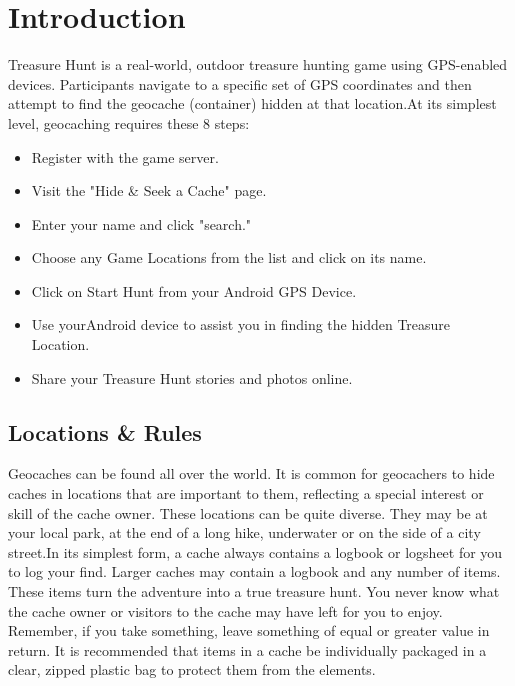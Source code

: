 



\usepackage{titlesec}
\titleformat{\chapter}[display]
{\normalfont\Large\bfseries}{\centering\chaptertitlename\ \thechapter}{12pt}{\Large}
\titlespacing*{\chapter}{0pt}{0pt}{10pt}


\chapter{ Introduction}
Treasure Hunt is a real-world, outdoor treasure hunting game using GPS-enabled devices. Participants navigate to a specific set of GPS coordinates and then attempt to find the geocache (container) hidden at that location.At its simplest level, geocaching requires these 8 steps:
\begin{itemize}



  \item Register with the game server.
  \item Visit the "Hide & Seek a Cache" page.
  \item Enter your name  and click "search."
  \item Choose any Game Locations from the list and click on its name.
  \item Click on Start Hunt from your Android  GPS Device.
  \item Use yourAndroid  device to assist you in finding the hidden Treasure Location.
   \item Share your Treasure Hunt stories and photos online.
 
\end{itemize}




\section{Locations & Rules }
Geocaches can be found all over the world. It is common for geocachers to hide caches in locations that are important to them, reflecting a special interest or skill of the cache owner. These locations can be quite diverse. They may be at your local park, at the end of a long hike, underwater or on the side of a city street.In its simplest form, a cache always contains a logbook or logsheet for you to log your find. Larger caches may contain a logbook and any number of items. These items turn the adventure into a true treasure hunt. You never know what the cache owner or visitors to the cache may have left for you to enjoy. Remember, if you take something, leave something of equal or greater value in return. It is recommended that items in a cache be individually packaged in a clear, zipped plastic bag to protect them from the elements.

